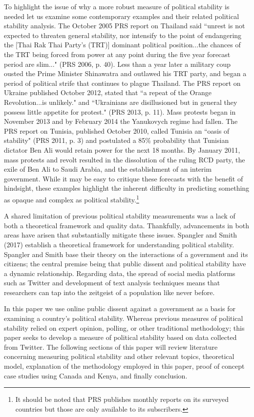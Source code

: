 \documentclass[12pt]{article}
\begin{document}
\begin{spacing}{1.5}
To highlight the issue of why a more robust measure of political stability is needed let us examine some contemporary examples and their related political stability analysis. The October 2005 PRS report on Thailand said ``unrest is not expected to threaten general stability, nor intensify to the point of endangering the [Thai Rak Thai Party's (TRT)] dominant political position...the chances of the TRT being forced from power at any point during the five year forecast period are slim..." (PRS 2006, p. 40). Less than a year later a military coup ousted the Prime Minister Shinawatra and outlawed his TRT party, and began a period of political strife that continues to plague Thailand. The PRS report on Ukraine published October 2012, stated that ``a repeat of the Orange Revolution...is unlikely." and ``Ukrainians are disillusioned but in general they possess little appetite for protest." (PRS 2013, p. 11). Mass protests began in November 2013 and by February 2014 the Yanukovych regime had fallen. The PRS report on Tunisia, published October 2010, called Tunisia an ``oasis of stability" (PRS 2011, p. 3) and postulated a 85\% probability that Tunisian dictator Ben Ali would retain power for the next 18 months. By January 2011, mass protests and revolt resulted in the dissolution of the ruling RCD party, the exile of Ben Ali to Saudi Arabia, and the establishment of an interim government. While it may be easy to critique these forecasts with the benefit of hindsight, these examples highlight the inherent difficulty in predicting something as opaque and complex as political stability.\footnote{It should be noted that PRS publishes monthly reports on its surveyed countries but those are only available to its subscribers.} 

A shared limitation of previous political stability measurements was a lack of both a theoretical framework and quality data. Thankfully, advancements in both areas have arisen that substantially mitigate these issues. Spangler and Smith (2017) establish a theoretical framework for understanding political stability. Spangler and Smith base their theory on the interactions of a government and its citizens; the central premise being that public dissent and political stability have a dynamic relationship. Regarding data, the spread of social media platforms such as Twitter and development of text analysis techniques means that researchers can tap into the zeitgeist of a population like never before. 

In this paper we use online public dissent against a government as a basis for examining a country's political stability. Whereas previous measures of political stability relied on expert opinion, polling, or other traditional methodology; this paper seeks to develop a measure of political stability based on data collected from Twitter. The following sections of this paper will review literature concerning measuring political stability and other relevant topics, theoretical model, explanation of the methodology employed in this paper, proof of concept case studies using Canada and Kenya, and finally conclusion. 


\end{spacing}
\end{document}
